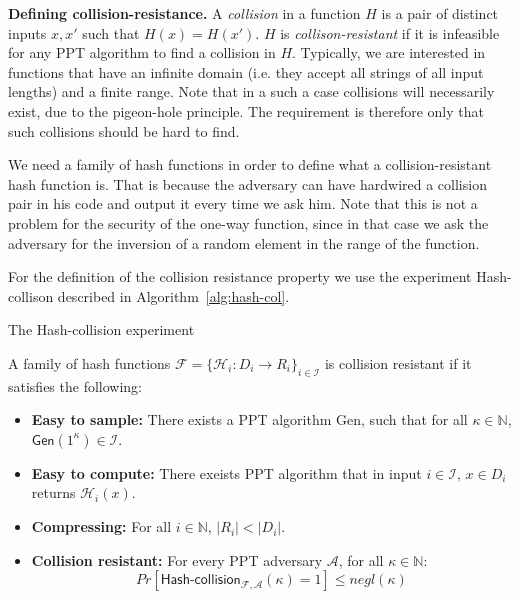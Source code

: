 \noindent
\textbf{Defining collision-resistance.}
A \emph{collision} in a function $H$ is a pair of distinct inputs $x, x'$ such that $H(x) = H(x')$. $H$ is \emph{collison-resistant} if it is infeasible for any PPT algorithm to find a collision in $H$. Typically, we are interested in functions that have an infinite domain (i.e. they accept all strings of all input lengths) and a finite range. Note that in a such a case collisions will necessarily exist, due to the pigeon-hole principle. The requirement is therefore only that such collisions should be hard to find. 

We need a family of hash functions in order to define what a collision-resistant hash function is. That is because the adversary can have hardwired a collision pair in his code and output it every time we ask him.  Note that this is not a problem for the security of the one-way function, since in that case we ask the adversary for the inversion of a random element in the range of the function.
 
For the definition of the collision resistance property we use the experiment \textsf{Hash-collison} described in Algorithm~\ref{alg:hash-col}.

\begin{algorithm}[h]
		\caption{\label{alg:hash-col} The \textsf{Hash-collision} experiment}
		\begin{algorithmic}[1]
					\State{}
				\EndIf
				\State{}
			\EndFunction
		\end{algorithmic}
\end{algorithm}

\begin{defn}\label{def:hash_function}
	A family of hash functions $\mathcal{F} = \{ \mathcal{H}_i: D_i \rightarrow R_i \}_{i \in \mathcal{I}}$ is collision resistant if it satisfies the following:
	\begin{itemize}
		\item \textbf{Easy to sample:} There exists a PPT algorithm \textsf{Gen}, such that for all $\kappa \in \mathbb{N}$, $\textsf{Gen}(1^\kappa) \in \mathcal{I}$.
		\item \textbf{Easy to compute:} There exeists PPT algorithm that in input $i \in \mathcal{I}$, $x \in D_i$ returns $\mathcal{H}_i(x)$.
		\item \textbf{Compressing:} For all $i \in \mathbb{N}$, $\lvert R_i \rvert < \lvert D_i \rvert$.
		\item \textbf{Collision resistant:} For every PPT adversary $\mathcal{A}$, for all $\kappa \in \mathbb{N}$:
		\begin{equation*}
			Pr[\textsf{Hash-collision}_{ \mathcal{F}, \mathcal{A}}(\kappa) = 1] \leq negl(\kappa)
		\end{equation*}
	\end{itemize}
\end{defn}